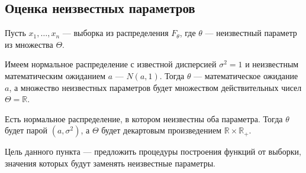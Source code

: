\begin{comment}
Если устремить количество полуинтервалов к бесконечности ($m\to\infty$),
то каждый полуинтервал будет сжиматься в точку.
При этом вероятность попадания $x$ в отрезок будет стремиться
к вероятности попадания $x$ в точку $y$.
Введём обозначения $|I_j|=\delta$, $I_j=\Delta_y$
$$\probabilityn{x=y}
\approx\probabilityn{x\in\Delta_y}=q_n\left(y\right)\cdot\delta,
\qquad m\to\infty$$

Очень напоминает ситуацию с плотностью распределения
непрерывной случайной величины $\xi$
$$\probability{\xi=x}\approx\pdf{x}\cdot\delta,\qquad\delta\to 0$$

Нужно отметить, что количество элементов выборки
должно стремиться к бесконечности ($n\to\infty$),
так как плотность может быть лишь у непрерывных случайных величин.
Чем больше будет элементов,
тем плотнее они будут стоять на числовой прямой.
\end{comment}
\subsection{Оценка неизвестных параметров}
Пусть $x_1, \dots, x_n$ --- выборка из распределения $F_\theta$,
где $\theta$ --- неизвестный параметр из множества $\Theta$.

\begin{example}
  Имеем нормальное распределение с известной дисперсией $\sigma^2 = 1$
  и неизвестным математическим ожиданием $a$ --- $N\left(a,1\right)$.
  Тогда $\theta$ --- математическое ожидание $a$, а множество неизвестных
  параметров будет множеством действительных чисел $\Theta = \mathbb{R}$.
\end{example}
\begin{example}
  Есть нормальное распределение, в котором неизвестны оба параметра.
  Тогда $\theta$ будет парой $\left( a,\sigma^2 \right)$,
  а $\Theta$ будет декартовым произведением $\mathbb{R} \times \mathbb{R_+}$.
\end{example}

Цель данного пункта --- предложить процедуры построения функций от выборки,
значения которых будут заменять неизвестные параметры.


